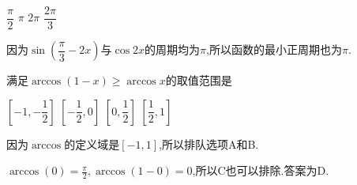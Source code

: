 \documentclass[answers]{exam}
\begin{document}
\begin{questions}
	\begin{oneparchoices}
		\choice $\dfrac{\pi}{2}$
		\CorrectChoice $\pi$
		\choice $2\pi$
		\choice $\dfrac{2\pi}{3}$
	\end{oneparchoices}

	\begin{solution}
		因为$\sin \left( \dfrac{\pi}{3} -2x \right)$与$\cos2x$的周期均为$\pi$,所以函数的最小正周期也为$\pi$.
	\end{solution}

	\question 满足$\arccos(1-x) \geqslant \arccos{x}$的取值范围是 \hfs

	\begin{oneparchoices}
		\choice $\left[-1, -\dfrac12\right]$
		\choice $\left[-\dfrac12, 0\right]$
		\choice $\left[0, \dfrac12\right]$
		\CorrectChoice $\left[\dfrac12, 1\right]$
	\end{oneparchoices}

	\begin{solution}
		因为$\arccos$的定义域是$[-1,1]$,所以排队选项A和B.

		$\arccos(0) = \frac{\pi}{2}, \arccos(1-0)=0$,所以C也可以排除.答案为D.
	\end{solution}

\end{questions}
\end{document}
